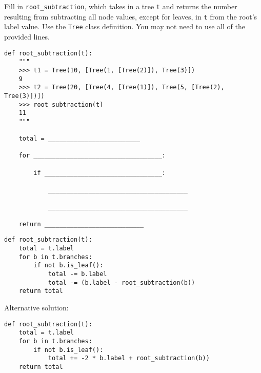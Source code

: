 \question
Fill in \lstinline{root_subtraction}, which takes in a tree \lstinline{t} and returns the number resulting from subtracting all node values, except for leaves, in \lstinline{t} from the root's label value. Use the \lstinline{Tree} class definition. You may not need to use all of the provided lines.

\begin{lstlisting}
def root_subtraction(t):
    """
    >>> t1 = Tree(10, [Tree(1, [Tree(2)]), Tree(3)])
    9
    >>> t2 = Tree(20, [Tree(4, [Tree(1)]), Tree(5, [Tree(2), Tree(3)])])
    >>> root_subtraction(t)
    11
    """

    total = _________________________

    for ___________________________________:

        if ________________________________:

            ______________________________________

            ______________________________________

    return ___________________________
\end{lstlisting}

\begin{solution}
\begin{lstlisting}
def root_subtraction(t):
    total = t.label
    for b in t.branches:
        if not b.is_leaf():
            total -= b.label
            total -= (b.label - root_subtraction(b))
    return total
\end{lstlisting}
Alternative solution:
\begin{lstlisting}
def root_subtraction(t):
    total = t.label
    for b in t.branches:
        if not b.is_leaf():
            total += -2 * b.label + root_subtraction(b))
    return total
\end{lstlisting}
\end{solution}